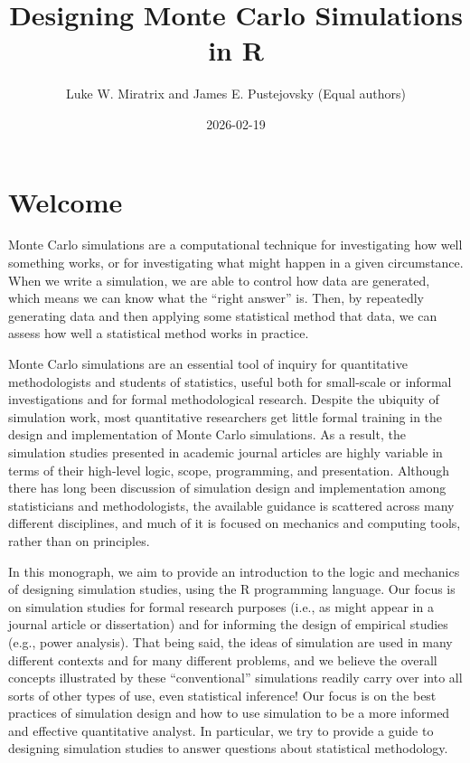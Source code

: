 \documentclass[
]{book}
\title{Designing Monte Carlo Simulations in R}
\author{Luke W. Miratrix and James E. Pustejovsky
(Equal authors)}
\date{2026-02-19}
\begin{document}
\maketitle

{
\setcounter{tocdepth}{1}
\tableofcontents
}
\chapter*{Welcome}\label{welcome}

Monte Carlo simulations are a computational technique for investigating how well something works, or for investigating what might happen in a given circumstance.
When we write a simulation, we are able to control how data are generated, which means we can know what the ``right answer'' is.
Then, by repeatedly generating data and then applying some statistical method that data, we can assess how well a statistical method works in practice.

Monte Carlo simulations are an essential tool of inquiry for quantitative methodologists and students of statistics, useful both for small-scale or informal investigations and for formal methodological research.
Despite the ubiquity of simulation work, most quantitative researchers get little formal training in the design and implementation of Monte Carlo simulations. As a result, the simulation studies presented in academic journal articles are highly variable in terms of their high-level logic, scope, programming, and presentation.
Although there has long been discussion of simulation design and implementation among statisticians and methodologists, the available guidance is scattered across many different disciplines, and much of it is focused on mechanics and computing tools, rather than on principles.

In this monograph, we aim to provide an introduction to the logic and mechanics of designing simulation studies, using the R programming language.
Our focus is on simulation studies for formal research purposes (i.e., as might appear in a journal article or dissertation) and for informing the design of empirical studies (e.g., power analysis).
That being said, the ideas of simulation are used in many different contexts and for many different problems, and we believe the overall concepts illustrated by these ``conventional'' simulations readily carry over into all sorts of other types of use, even statistical inference!
Our focus is on the best practices of simulation design and how to use simulation to be a more informed and effective quantitative analyst.
In particular, we try to provide a guide to designing simulation studies to answer questions about statistical methodology.
\end{document}
